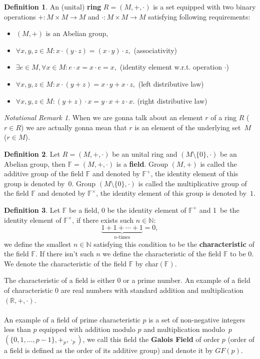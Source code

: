 \documentclass[thesis=M,english]{FITthesis}[2012/10/20]
\theoremstyle{remark}
\newtheorem*{NRM}{Notational Remark}
\theoremstyle{definition}
\newtheorem{DF}{Definition}[section]
\begin{document}
\begin{DF}
An (unital) \textbf{ring} $R = (M, +, \cdot)$  is a set equipped with two binary operations $+: M\times M \to M$ and $\cdot:  M\times M \to M$ satisfying following requirements:
\begin{itemize}
\item $(M, +)$ is an Abelian group, 
\item $\forall x,y,z \in M: x\cdot(y\cdot z) = (x \cdot y) \cdot z, $ \hfill (associativity)
\item $\exists e \in M,\forall x \in M: e \cdot x = x \cdot e = x,$ \hfill (identity element w.r.t. operation $\cdot$)
\item $\forall x,y,z \in M:x \cdot(y+z)= x\cdot y + x \cdot z,$ \hfill (left distributive law) 
\item $\forall x,y, z \in M:(y + z) \cdot x = y\cdot x + z \cdot x.$ \hfill(right distributive law)
\end{itemize}
\end{DF}
\begin{NRM}
When we are gonna talk about an element $r$ of a ring $R$ ($r \in R$) we are actually gonna mean that $r$ is an element of the underlying set~$M$ ($r \in M$).
\end{NRM}
\begin{DF}
Let $R = (M,+,\cdot)$ be an unital ring and $(M \setminus \{0\}, \cdot)$ be an Abelian group, then $\mathbb{F} = (M, +, \cdot)$ is a \textbf{field}. Group $(M, +)$ is  called the additive group of the field $\mathbb{F}$ and denoted by $\mathbb{F}^+$, the identity element of this group is denoted by~$0$. Group $(M \setminus \{0\}, \cdot)$ is called the multiplicative group of the field $\mathbb{F}$ and denoted by $\mathbb{F}^\times$, the identity element of this group is denoted by~$1$.
\end{DF}
\begin{DF}
Let $\mathbb{F}$ be a field, 0 be the identity element of $\mathbb{F}^+$ and 1~be the identity element of $\mathbb{F}^\times$, if there exists such $n \in \mathbb{N}:$
$$
 \underbrace{1 + 1 + \cdots + 1}_\text{$n$-times} = 0,
$$ we define the smallest $n \in \mathbb{N}$ satisfying this condition to be the \textbf{characteristic} of the field $\mathbb{F}.$ If there isn't such $n$ we define the characteristic of the field $\mathbb{F}$ to be $0$. We denote the characteristic of the field $\mathbb{F}$ by char$(\mathbb{F})$.
\end{DF}
\noindent The characteristic of a field is either $0$ or a prime number. An example of a field of characteristic $0$ are real numbers with standard addition and multiplication $(\mathbb{R}, +, \cdot)$. \\ \\
An example of a field of prime characteristic $p$ is a set of non-negative integers less than $p$ equipped with addition modulo $p$ and multiplication modulo~$p$ $(\{0, 1, \ldots, p-1\}, +_p, \cdot_p)$, we call this field the \textbf{Galois Field} of order $p$ (order of a field is defined as the order of its additive group) and denote it by $GF(p)$.
\end{document}
